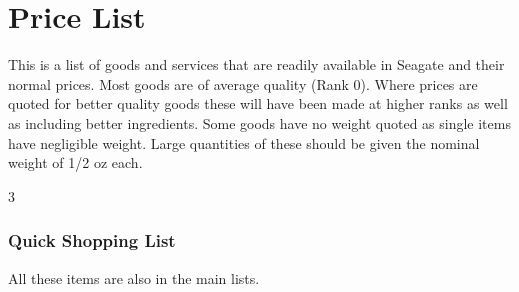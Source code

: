 \section{Price List}

This is a list of goods and services that are readily available in
Seagate and their normal prices. Most goods are of average quality
(Rank 0).  Where prices are quoted for better quality goods these will
have been made at higher ranks as well as including better
ingredients.  Some goods have no weight quoted as single items have
negligible weight. Large quantities of these should be given the
nominal weight of 1/2 oz each.

\begin{@empty}
\setlength{\columnsep}{3mm}
\begin{multicols}{3}

\subsubsection{Quick Shopping List}

All these items are also in the main lists.


\end{multicols}
\end{@empty}
